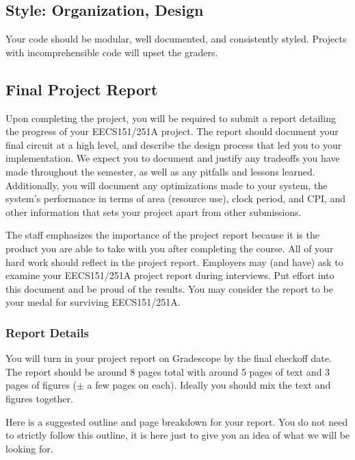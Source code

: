 \documentclass[11pt]{article}
\begin{document}
\subsection{Style: Organization, Design}
\label{style}
Your code should be modular, well documented, and consistently styled.
Projects with incomprehensible code will upset the graders.

\subsection{Final Project Report}
Upon completing the project, you will be required to submit a report detailing the progress of your EECS151/251A project.
The report should document your final circuit at a high level, and describe the design process that led you to your implementation.
We expect you to document and justify any tradeoffs you have made throughout the semester, as well as any pitfalls and lessons learned.
Additionally, you will document any optimizations made to your system, the system's performance in terms of area (resource use), clock period, and CPI, and other information that sets your project apart from other submissions.

The staff emphasizes the importance of the project report because it is the product you are able to take with you after completing the course.
All of your hard work should reflect in the project report.
Employers may (and have) ask to examine your EECS151/251A project report during interviews.
Put effort into this document and be proud of the results.
You may consider the report to be your medal for surviving EECS151/251A.

\subsubsection{Report Details}
You will turn in your project report on Gradescope by the final checkoff date.
The report should be around 8 pages total with around 5 pages of text and 3 pages of figures ($\pm$ a few pages on each).
Ideally you should mix the text and figures together.

Here is a suggested outline and page breakdown for your report.
You do not need to strictly follow this outline, it is here just to give you an idea of what we will be looking for.
\end{document}
